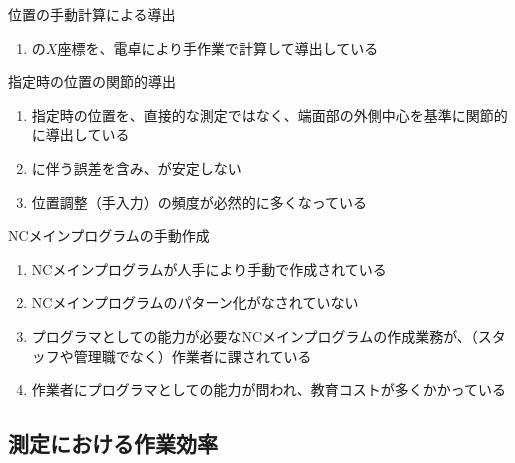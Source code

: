 \begin{Issues}{\KeywayCenter 位置の手動計算による導出}
\begin{enumerate}[label=\sarrow]
\item[{\sarrow[red]}]\KeywayCenter の$X$座標を、電卓により手作業で計算して導出している
\end{enumerate}
\end{Issues}

\begin{Issues}{\AsideKeywayDepth 指定時の\KeywayCenter 位置の関節的導出}
\begin{enumerate}[label=\sarrow]
\item[{\sarrow[red]}]\AsideKeywayDepth 指定時の\KeywayCenter 位置を、直接的な測定ではなく、端面部の外側中心を基準に関節的に導出している
\item[{\sarrow[red]}]\CenterCurvature に伴う誤差を含み、\AsideKeywayDepth が安定しない
\item[{\sarrow[red]}]位置調整（手入力）の頻度が必然的に多くなっている
\end{enumerate}
\end{Issues}

\begin{Issues}{NCメインプログラムの手動作成}
\begin{enumerate}[label=\sarrow]
\item[{\sarrow[red]}]NCメインプログラムが人手により手動で作成されている
\item[{\sarrow[red]}]NCメインプログラムのパターン化がなされていない
\item[{\sarrow[red]}]プログラマとしての能力が必要なNCメインプログラムの作成業務が、（スタッフや管理職でなく）作業者に課されている
\item[{\sarrow[red]}]作業者にプログラマとしての能力が問われ、教育コストが多くかかっている
\end{enumerate}
\end{Issues}


\subsection{測定における作業効率}

